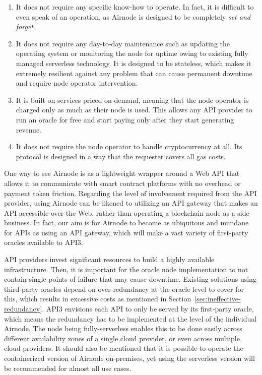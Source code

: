 \documentclass[11pt]{article}
\begin{document}
\begin{enumerate}
    \item It does not require any specific know-how to operate.
    In fact, it is difficult to even speak of an operation, as Airnode is designed to be completely \textit{set and forget}.
    \item It does not require any day-to-day maintenance such as updating the operating system or monitoring the node for uptime owing to existing fully managed serverless technology.
    It is designed to be stateless, which makes it extremely resilient against any problem that can cause permanent downtime and require node operator intervention.
    \item It is built on services priced on-demand, meaning that the node operator is charged only as much as their node is used.
    This allows any API provider to run an oracle for free and start paying only after they start generating revenue.
    \item It does not require the node operator to handle cryptocurrency at all.
    Its protocol is designed in a way that the requester covers all gas costs.
\end{enumerate}

One way to see Airnode is as a lightweight wrapper around a Web API that allows it to communicate with smart contract platforms with no overhead or payment token friction.
Regarding the level of involvement required from the API provider, using Airnode can be likened to utilizing an API gateway that makes an API accessible over the Web, rather than operating a blockchain node as a side-business.
In fact, our aim is for Airnode to become as ubiquitous and mundane for APIs as using an API gateway, which will make a vast variety of first-party oracles available to API3.

API providers invest significant resources to build a highly available infrastructure.
Then, it is important for the oracle node implementation to not contain single points of failure that may cause downtime.
Existing solutions using third-party oracles depend on over-redundancy at the oracle level to cover for this, which results in excessive costs as mentioned in Section~\ref{sec:ineffective-redundancy}.
API3 envisions each API to only be served by its first-party oracle, which means the redundancy has to be implemented at the level of the individual Airnode.
The node being fully-serverless enables this to be done easily across different availability zones of a single cloud provider, or even across multiple cloud providers.
It should also be mentioned that it is possible to operate the containerized version of Airnode on-premises, yet using the serverless version will be recommended for almost all use cases.
\end{document}
